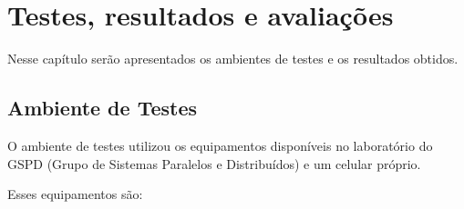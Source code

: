 \chapter{Testes, resultados e avaliações}

Nesse capítulo serão apresentados os ambientes de testes e os resultados obtidos.

\section{Ambiente de Testes}

    O ambiente de testes utilizou os equipamentos disponíveis no laboratório do GSPD (Grupo de Sistemas Paralelos e Distribuídos) e um celular próprio.
    
    Esses equipamentos são:
    
